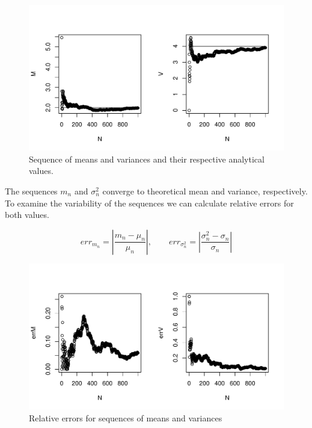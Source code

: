 \documentclass[12pt, a4paper]{article}\usepackage[]{graphicx}\usepackage[]{color}
\makeatletter
\def\maxwidth{ %
  \ifdim\Gin@nat@width>\linewidth
    \linewidth
  \else
    \Gin@nat@width
  \fi
}
\newenvironment{knitrout}{}{} %
\makeatother
\begin{document}
\begin{knitrout}
\color{fgcolor}\begin{figure}[H]

{\centering \includegraphics[width=\maxwidth]{figure/ex1_2seq-1} 

}

\caption[Sequence of means and variances and their respective analytical values]{Sequence of means and variances and their respective analytical values.}\label{fig:ex1.2seq}
\end{figure}


\end{knitrout}

The sequences $m_n$ and $\sigma_n^2$ converge to theoretical mean and variance, respectively. To examine the variability of the sequences we can calculate relative errors for both values.

\[ err_{m_n} = \left| \frac{m_n - \mu_n}{\mu_n}  \right| , \qquad
   err_{\sigma_n^2} = \left| \frac{\sigma_n^2 - \sigma_n}{\sigma_n}  \right| \]

\begin{knitrout}
\color{fgcolor}\begin{figure}[H]

{\centering \includegraphics[width=\maxwidth]{figure/ex1_2err-1} 

}

\caption[Relative errors for sequences of means and variances]{Relative errors for sequences of means and variances}\label{fig:ex1.2err}
\end{figure}


\end{knitrout}
\end{document}
